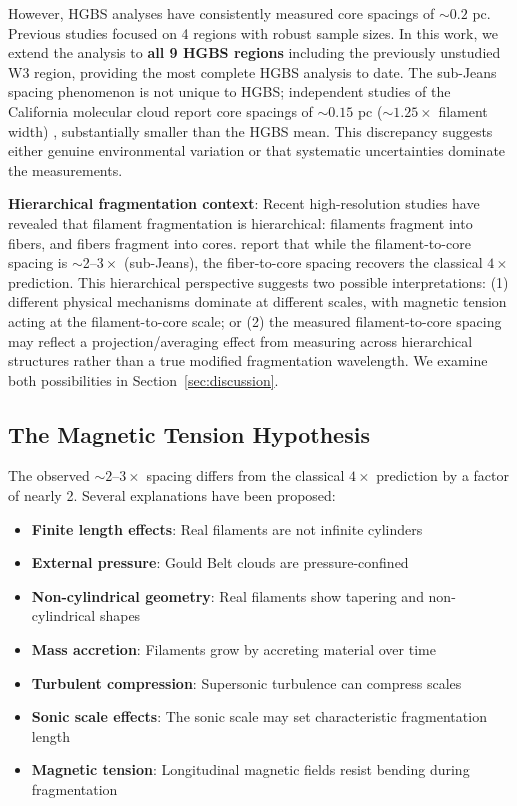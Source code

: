 \documentclass[11pt,a4paper]{article}
\begin{document}
However, HGBS analyses have consistently measured core spacings of $\sim0.2$ pc. Previous studies focused on 4 regions with robust sample sizes. In this work, we extend the analysis to \textbf{all 9 HGBS regions} including the previously unstudied W3 region, providing the most complete HGBS analysis to date. The sub-Jeans spacing phenomenon is not unique to HGBS; independent studies of the California molecular cloud report core spacings of $\sim0.15$ pc ($\sim1.25\times$ filament width) \citep{Zhang2024}, substantially smaller than the HGBS mean. This discrepancy suggests either genuine environmental variation or that systematic uncertainties dominate the measurements.

\textbf{Hierarchical fragmentation context}: Recent high-resolution studies \citep{Yang2024} have revealed that filament fragmentation is hierarchical: filaments fragment into fibers, and fibers fragment into cores. \citet{Yang2024} report that while the filament-to-core spacing is $\sim$2--$3\times$ (sub-Jeans), the fiber-to-core spacing recovers the classical $4\times$ prediction. This hierarchical perspective suggests two possible interpretations: (1) different physical mechanisms dominate at different scales, with magnetic tension acting at the filament-to-core scale; or (2) the measured filament-to-core spacing may reflect a projection/averaging effect from measuring across hierarchical structures rather than a true modified fragmentation wavelength. We examine both possibilities in Section~\ref{sec:discussion}.

\subsection{The Magnetic Tension Hypothesis}

The observed $\sim2$--$3\times$ spacing differs from the classical $4\times$ prediction by a factor of nearly 2. Several explanations have been proposed:

\begin{itemize}
    \item \textbf{Finite length effects}: Real filaments are not infinite cylinders \citep{Inutsuka1997}
    \item \textbf{External pressure}: Gould Belt clouds are pressure-confined \citep{Fischera2012}
    \item \textbf{Non-cylindrical geometry}: Real filaments show tapering and non-cylindrical shapes
    \item \textbf{Mass accretion}: Filaments grow by accreting material over time \citep{Heitsch2013, Chen2024}
    \item \textbf{Turbulent compression}: Supersonic turbulence can compress scales \citep{Padoan2011}
    \item \textbf{Sonic scale effects}: The sonic scale may set characteristic fragmentation length \citep{Federrath2016}
    \item \textbf{Magnetic tension}: Longitudinal magnetic fields resist bending during fragmentation
\end{itemize}
\end{document}
